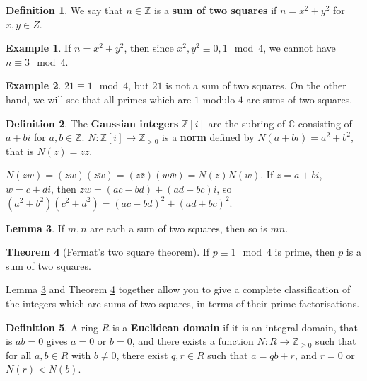 \documentclass{article}
\newcommand{\Z}{\mathbb{Z}}
\newcommand{\C}{\mathbb{C}}
\newcommand{\rb}[1]{\left( #1 \right)}
\renewcommand{\sb}[1]{\left[ #1 \right]}
\theoremstyle{definition}\newtheorem{definition}{Definition}
\theoremstyle{definition}\newtheorem*{remark}{Remark}
\theoremstyle{definition}\newtheorem*{example}{Example}
\theoremstyle{definition}\newtheorem*{note}{Note}
\newtheorem{lemma}[definition]{Lemma}
\newtheorem{theorem}[definition]{Theorem}
\begin{document}
\begin{definition}
We say that $ n \in \Z $ is a \textbf{sum of two squares} if $ n = x^2 + y^2 $ for $ x, y \in Z $.
\end{definition}

\begin{example}
If $ n = x^2 + y^2 $, then since $ x^2, y^2 \equiv 0, 1 \mod 4 $, we cannot have $ n \equiv 3 \mod 4 $.
\end{example}

\begin{example}
$ 21 \equiv 1 \mod 4 $, but $ 21 $ is not a sum of two squares. On the other hand, we will see that all primes which are $ 1 $ modulo $ 4 $ are sums of two squares.
\end{example}

\begin{definition}
The \textbf{Gaussian integers} $ \Z\sb{i} $ are the subring of $ \C $ consisting of $ a + bi $ for $ a, b \in \Z $. $ N : \Z\sb{i} \to \Z_{> 0} $ is a \textbf{norm} defined by $ N\rb{a + bi} = a^2 + b^2 $, that is $ N\rb{z} = z\bar{z} $.
\end{definition}

$ N\rb{zw} = \rb{zw}\rb{\bar{zw}} = \rb{z\bar{z}}\rb{w\bar{w}} = N\rb{z}N\rb{w} $. If $ z = a + bi $, $ w = c + di $, then $ zw = \rb{ac - bd} + \rb{ad + bc}i $, so $ \rb{a^2 + b^2}\rb{c^2 + d^2} = \rb{ac - bd}^2 + \rb{ad + bc}^2 $.

\begin{lemma}
\label{lem:46}
If $ m, n $ are each a sum of two squares, then so is $ mn $.
\end{lemma}

\begin{theorem}[Fermat's two square theorem]
\label{thm:47}
If $ p \equiv 1 \mod 4 $ is prime, then $ p $ is a sum of two squares.
\end{theorem}

Lemma \ref{lem:46} and Theorem \ref{thm:47} together allow you to give a complete classification of the integers which are sums of two squares, in terms of their prime factorisations.

\begin{definition}
A ring $ R $ is a \textbf{Euclidean domain} if it is an integral domain, that is $ ab = 0 $ gives $ a = 0 $ or $ b = 0 $, and there exists a function $ N : R \to \Z_{\ge 0} $ such that for all $ a, b \in R $ with $ b \ne 0 $, there exist $ q, r \in R $ such that $ a = qb + r $, and $ r = 0 $ or $ N\rb{r} < N\rb{b} $.
\end{definition}
\end{document}
